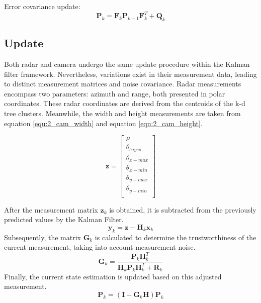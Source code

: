 Error covariance update:
\begin{equation}\label{equ:error_covariance}
    \mathbf{P}_k=\mathbf{F}_k \mathbf{P}_{k-1} \mathbf{F}_k^T+\mathbf{Q}_k
\end{equation}

\subsection{Update}\label{equ:2_update}

Both radar and camera undergo the same update procedure within the Kalman filter framework. 
Nevertheless, variations exist in their measurement data, 
leading to distinct measurement matrices and noise covariance. 
Radar measurements encompass two parameters: azimuth and range, 
both presented in polar coordinates. 
These radar coordinates are derived from the centroids of the k-d tree clusters.
Meanwhile, the width and height measurements are taken from equation \ref{equ:2_cam_width} and equation \ref{equ:2_cam_height}.

\begin{equation}
    \mathbf{z}=
    \begin{bmatrix}
        \rho \\ 
        \theta_{bayes}\\
        \theta_{x-max}\\
        \theta_{x-min}\\
        \theta_{y-max}\\
        \theta_{y-min}\\
    \end{bmatrix}
\end{equation}


After the measurement matrix $\mathbf{z}_k$ is obtained, 
it is subtracted from the previously predicted values by the Kalman Filter. 
\begin{equation}
    \mathbf{y}_{k}=\mathbf{z}-\mathbf{H}_k \mathbf{x}_k
\end{equation}
Subsequently, the matrix $ \mathbf{G}_k $ is calculated to determine the trustworthiness of the current measurement, taking into account measurement noise. 
\begin{equation}
    \mathbf{G}_k = \frac{\mathbf{P}_k \mathbf{H}_k^T}{\mathbf{H}_k\mathbf{P}_k\mathbf{H}_k^T + \mathbf{R}_k}
\end{equation}
Finally, the current state estimation is updated based on this adjusted measurement.
\begin{equation}
    \mathbf{P}_k = (\mathbf{I} - \mathbf{G}_k\mathbf{H})\mathbf{P}_k
\end{equation}

